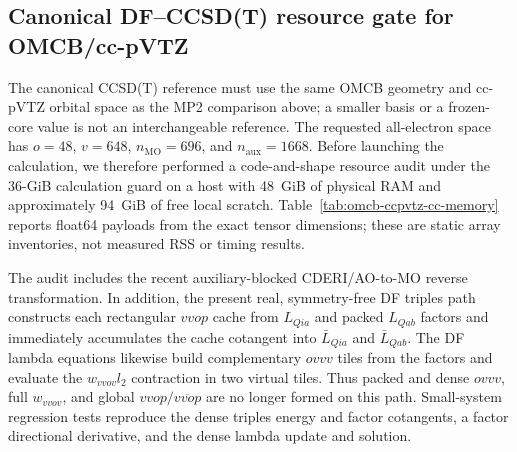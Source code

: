 \documentclass[11pt]{article}
\begin{document}
\subsection{Canonical DF--CCSD(T) resource gate for OMCB/cc-pVTZ}
\label{sec:omcb-ccpvtz-cc-resource-gate}

The canonical CCSD(T) reference must use the same OMCB geometry and cc-pVTZ
orbital space as the MP2 comparison above; a smaller basis or a frozen-core
value is not an interchangeable reference.  The requested all-electron space
has $o=48$, $v=648$, $n_{\mathrm{MO}}=696$, and
$n_{\mathrm{aux}}=1668$.  Before launching the calculation, we therefore
performed a code-and-shape resource audit under the 36-GiB calculation guard
on a host with 48~GiB of physical RAM and approximately 94~GiB of free local
scratch.  Table~\ref{tab:omcb-ccpvtz-cc-memory} reports float64 payloads from
the exact tensor dimensions; these are static array inventories, not measured
RSS or timing results.

The audit includes the recent auxiliary-blocked CDERI/AO-to-MO reverse
transformation.  In addition, the present real, symmetry-free DF triples path
constructs each rectangular $vvop$ cache from $L_{Qia}$ and packed
$L_{Qab}$ factors and immediately accumulates the cache cotangent into
$\bar L_{Qia}$ and $\bar L_{Qab}$.  The DF lambda equations likewise build
complementary $ovvv$ tiles from the factors and evaluate the
$w_{vvov}l_2$ contraction in two virtual tiles.  Thus packed and dense
$ovvv$, full $w_{vvov}$, and global $vvop/\overline{vvop}$ are no longer
formed on this path.  Small-system regression tests reproduce the dense
triples energy and factor cotangents, a factor directional derivative, and
the dense lambda update and solution.
\end{document}
